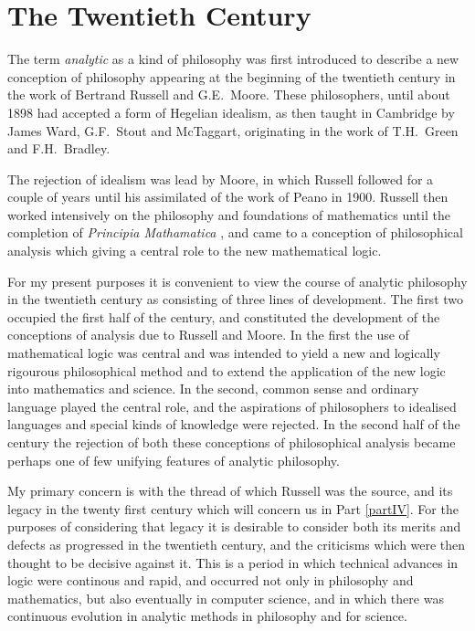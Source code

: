 
\part{The Twentieth Century}\label{partIII}

The term \emph{analytic} as a kind of philosophy was first introduced to describe a new conception of philosophy appearing at the beginning of the twentieth century in the work of Bertrand Russell and G.E.~Moore.
These philosophers, until about 1898 had accepted a form of Hegelian idealism, as then taught in Cambridge by James Ward, G.F.~Stout and McTaggart, originating in the work of T.H.~Green and F.H.~Bradley.

The rejection of idealism was lead by Moore, in which Russell followed for a couple of years until his assimilated of the work of Peano in 1900.
Russell then worked intensively on the philosophy and foundations of mathematics until the completion of \emph{Principia Mathamatica} \cite{russell10}, and came to a conception of philosophical analysis which giving a central role to the new mathematical logic.

For my present purposes it is convenient to view the course of analytic philosophy in the twentieth century as consisting of three lines of development.
The first two occupied the first half of the century, and constituted the development of the conceptions of analysis due to Russell and Moore.
In the first the use of mathematical logic was central and was intended to yield a new and logically rigourous philosophical method and to extend the application of the new logic into mathematics and science.
In the second, common sense and ordinary language played the central role, and the aspirations of philosophers to idealised languages and special kinds of knowledge were rejected.
In the second half of the century the rejection of both these conceptions of philosophical analysis became perhaps one of few unifying features of analytic philosophy.

My primary concern is with the thread of which Russell was the source, and its legacy in the twenty first century which will concern us in Part \ref{partIV}.
For the purposes of considering that legacy it is desirable to consider both its merits and defects as progressed in the twentieth century, and the criticisms which were then thought to be decisive against it.
This is a period in which technical advances in logic were continous and rapid, and occurred not only in philosophy and mathematics, but also eventually in computer science, and in which there was continuous evolution in analytic methods in philosophy and for science.

